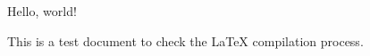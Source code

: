 \documentclass{article}
\begin{document}
Hello, world!

This is a test document to check the LaTeX compilation process.
\end{document}
